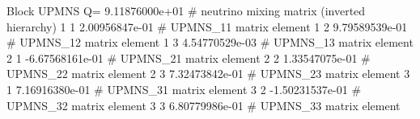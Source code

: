 Block UPMNS Q= 9.11876000e+01 # neutrino mixing matrix (inverted  hierarchy)
  1  1     2.00956847e-01   # UPMNS_{11} matrix element
  1  2     9.79589539e-01   # UPMNS_{12} matrix element
  1  3     4.54770529e-03   # UPMNS_{13} matrix element
  2  1    -6.67568161e-01   # UPMNS_{21} matrix element
  2  2     1.33547075e-01   # UPMNS_{22} matrix element
  2  3     7.32473842e-01   # UPMNS_{23} matrix element
  3  1     7.16916380e-01   # UPMNS_{31} matrix element
  3  2    -1.50231537e-01   # UPMNS_{32} matrix element
  3  3     6.80779986e-01   # UPMNS_{33} matrix element
